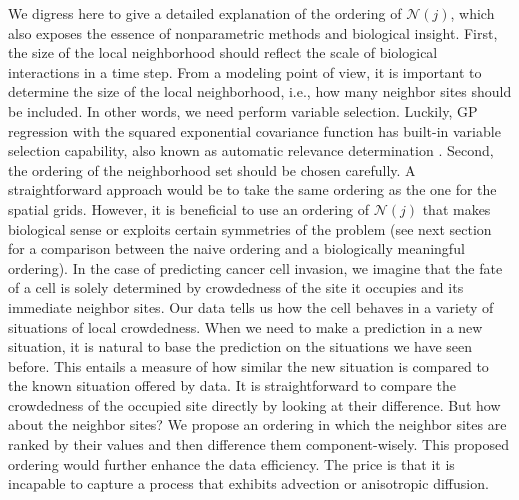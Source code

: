 \documentclass[smallextended,natbib]{svjour3}       %
\begin{document}
We digress here to give a detailed explanation of the ordering of $\mathcal{N}(j)$, which also exposes the essence of nonparametric methods and biological insight. First, the size of the local neighborhood should reflect the scale of biological interactions in a time step. From a modeling point of view, it is important to determine the size of the local neighborhood, i.e., how many neighbor sites should be included. In other words, we need perform variable selection. Luckily, GP regression with the squared exponential covariance function has built-in variable selection capability, also known as automatic relevance determination \citep{neal2012bayesian,williams1996gaussian,Rasmussen2006}. Second, the ordering of the neighborhood set should be chosen carefully. A straightforward approach would be to take the same ordering as the one for the spatial grids. However, it is beneficial to use an ordering of $\mathcal{N}(j)$ that makes biological sense or exploits certain symmetries of the problem (see next section for a comparison between the naive ordering and a biologically meaningful ordering). In the case of predicting cancer cell invasion, we imagine that the fate of a cell is solely determined by crowdedness of the site it occupies and its immediate neighbor sites. Our data tells us how the cell behaves in a variety of situations of local crowdedness. When we need to make a prediction in a new situation, it is natural to base the prediction on the situations we have seen before. This entails a measure of how similar the new situation is compared to the known situation offered by data. It is straightforward to compare the crowdedness of the occupied site directly by looking at their difference. But how about the neighbor sites? We propose an ordering in which the neighbor sites are ranked by their values and then difference them component-wisely. This proposed ordering would further enhance the data efficiency. The price is that it is incapable to capture a process that exhibits advection or anisotropic diffusion. 
\end{document}

